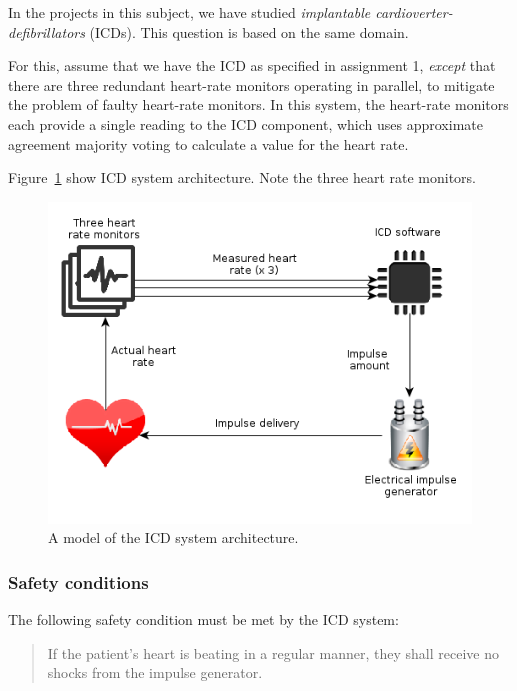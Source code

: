 

In the projects in this subject, we have studied \emph{implantable cardioverter-defibrillators} (ICDs). This question is based on the same domain.

For this, assume that we have the ICD as specified in assignment 1, \emph{except} that there are three redundant heart-rate monitors operating in parallel, to mitigate the problem of faulty heart-rate monitors. In this system, the heart-rate monitors each provide a single reading to the ICD component, which uses approximate agreement majority voting to calculate a value for the heart rate.

Figure~\ref{fig:icd-loop} show ICD system architecture. Note the three heart rate monitors.

\begin{figure}[!h]
\centering
\includegraphics[scale=0.6]{./figs/icd-loop}
\caption{A model of the ICD system architecture.}
\label{fig:icd-loop}
\end{figure}


\subsubsection*{Safety conditions}

The following safety condition must be met by the ICD system:

\begin{quote}

 If the patient's heart is beating in a regular manner, they shall receive no shocks from the impulse generator.

\end{quote}

